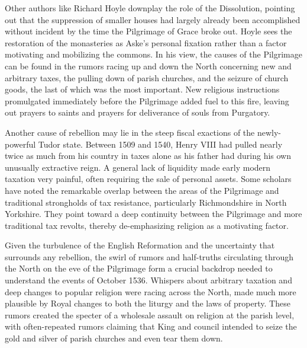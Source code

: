 \documentclass[12pt]{article}
\begin{document}
Other authors like Richard Hoyle downplay the role of the Dissolution, pointing out that the suppression of smaller houses had largely already been accomplished without incident by the time the Pilgrimage of Grace broke out. Hoyle sees the restoration of the monasteries as Aske's personal fixation rather than a factor motivating and mobilizing the commons.\autocite[48-50]{Hoyle2001} In his view, the causes of the Pilgrimage can be found in the rumors racing up and down the North concerning new and arbitrary taxes, the pulling down of parish churches, and the seizure of church goods, the last of which was the most important.\autocite[88-91]{Hoyle2001} New religious instructions promulgated immediately before the Pilgrimage added fuel to this fire, leaving out prayers to saints and prayers for deliverance of souls from Purgatory.\autocite[86]{Hoyle2001}

Another cause of rebellion may lie in the steep fiscal exactions of the newly-powerful Tudor state. Between 1509 and 1540, Henry VIII had pulled nearly twice as much from his country in taxes alone as his father had during his own unusually extractive reign.\autocite[27]{Fletcher2008} A general lack of liquidity made early modern taxation very painful, often requiring the sale of personal assets.\autocite[656-8]{Hoyle1998} Some scholars have noted the remarkable overlap between the areas of the Pilgrimage and traditional strongholds of tax resistance, particularly Richmondshire in North Yorkshire.\autocite[174]{Hoyle1993} They point toward a deep continuity between the Pilgrimage and more traditional tax revolts, thereby de-emphasizing religion as a motivating factor.

Given the turbulence of the English Reformation and the uncertainty that surrounds any rebellion, the swirl of rumors and half-truths circulating through the North on the eve of the Pilgrimage form a crucial backdrop needed to understand the events of October 1536. Whispers about arbitrary taxation and deep changes to popular religion were racing across the North, made much more plausible by Royal changes to both the liturgy and the laws of property.\autocite[28-9]{Fletcher2008} These rumors created the specter of a wholesale assault on religion at the parish level, with often-repeated rumors claiming that King and council intended to seize the gold and silver of parish churches and even tear them down.\autocite[88-91]{Hoyle2001}
\end{document}
